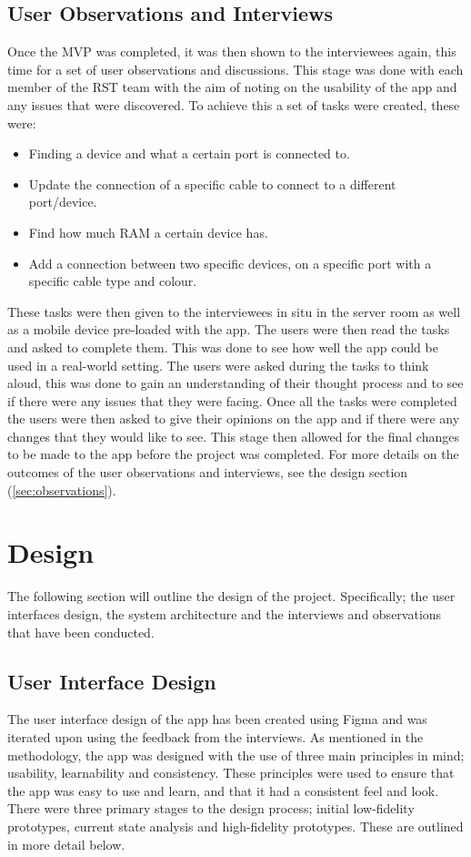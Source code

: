 \documentclass [11pt,a4paper]{article}
\begin{document}
\subsection{User Observations and Interviews}
\label{sec:user_observations_and_interviews}
Once the MVP was completed, it was then shown to the interviewees again, this time for a set of user observations and discussions. This stage was done with each member of the RST team with the aim of noting on the usability of the app and any issues that were discovered. To achieve this a set of tasks were created, these were:
\begin{itemize}
    \item Finding a device and what a certain port is connected to.
    \item Update the connection of a specific cable to connect to a different port/device.
    \item Find how much RAM a certain device has.
    \item Add a connection between two specific devices, on a specific port with a specific cable type and colour.
\end{itemize}

These tasks were then given to the interviewees in situ in the server room as well as a mobile device pre-loaded with the app. The users were then read the tasks and asked to complete them. This was done to see how well the app could be used in a real-world setting. The users were asked during the tasks to think aloud, this was done to gain an understanding of their thought process and to see if there were any issues that they were facing. Once all the tasks were completed the users were then asked to give their opinions on the app and if there were any changes that they would like to see. This stage then allowed for the final changes to be made to the app before the project was completed. For more details on the outcomes of the user observations and interviews, see the design section (\ref{sec:observations}).

\section{Design}
\label{sec:design}
The following section will outline the design of the project. Specifically; the user interfaces design, the system architecture and the interviews and observations that have been conducted.

\subsection{User Interface Design}
\label{sec:ui_design}
The user interface design of the app has been created using Figma and was iterated upon using the feedback from the interviews. As mentioned in the methodology, the app was designed with the use of three main principles in mind; usability, learnability and consistency. These principles were used to ensure that the app was easy to use and learn, and that it had a consistent feel and look. There were three primary stages to the design process; initial low-fidelity prototypes, current state analysis and high-fidelity prototypes. These are outlined in more detail below. 
\end{document}
